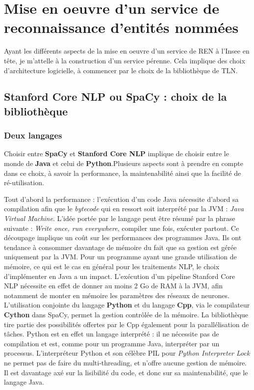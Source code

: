 \section{Mise en oeuvre d'un service de reconnaissance d'entités nommées}
Ayant les différents aspects de la mise en oeuvre d'un service de REN à l'Insee en tête, je m'attelle à la construction d'un service pérenne. Cela implique des choix d'architecture logicielle, à commencer par le choix de la bibliothèque de TLN.

\subsection{Stanford Core NLP ou SpaCy : choix de la bibliothèque}

\subsubsection{Deux langages}
Choisir entre \textbf{SpaCy} et \textbf{Stanford Core NLP} implique de choisir entre le monde de \textbf{Java} et celui de \textbf{Python}.Plusieurs aspects sont à prendre en compte dans ce choix, à savoir la performance, la maintenabilité ainsi que la facilité de ré-utilisation. 
\newline

Tout d'abord la performance : l'exécution d'un code Java nécessite d'abord sa compilation afin que le \textit{bytecode} qui en ressort soit interprété par la JVM : \textit{Java Virtual Machine}. L'idée portée par le langage peut être résumé par la phrase suivante : \textit{Write once, run everywhere}, compiler une fois, exécuter partout. Ce découpage implique un coût sur les performances des programmes Java. Ils ont tendance à consommer davantage de mémoire du fait que sa gestion est gérée uniquement par la JVM. Pour un programme ayant une grande utilisation de mémoire, ce qui est le cas en général pour les traitements NLP, le choix d'implémenter en Java a un impact. L'exécution d'un pipeline Stanford Core NLP nécessite en effet de donner au moins 2 Go de RAM à la JVM, afin notamment de monter en mémoire les paramètres des réseaux de neurones. L'utilisation conjointe du langage \textbf{Python} et du langage \textbf{Cpp}, via le compilateur \textbf{Cython} dans SpaCy, permet la gestion contrôlée de la mémoire. La bibliothèque tire partie des possibilités offertes par le Cpp également pour la parallélisation de tâches. Python est en effet un langage interprété : il ne nécessite pas de compilation et est, comme pour un programme Java, interpréter par un processus. L'interpréteur Python et son célèbre PIL pour \textit{Python Interpreter Lock} ne permet pas de faire du multi-threading, et n'offre aucune gestion de mémoire. Il est davantage axé sur la lisibilité du code, et donc sur sa maintenabilité, que le langage Java.
\newline

